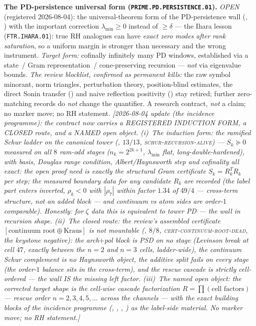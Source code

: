 \documentclass[11pt,a4paper]{article}
\begin{document}
\par\smallskip\noindent\textbf{The PD-persistence universal form
(\texttt{PRIME.PD.PERSISTENCE.01}).}
\emph{OPEN} (registered 2026-08-04): the universal-theorem form of
the PD-persistence wall (,
) with the important correction
$\lambda_{\min}\ge0$ instead of $\ge\delta$ --- the Ihara lesson
(\texttt{FTR.IHARA.01}): true RH analogues can have \emph{exact zero
modes after rank saturation}, so a uniform margin is stronger than
necessary and the wrong instrument.  \emph{Target form:} cofinally
infinitely many PD windows, established via a state~/ Gram
representation~/ cone-preserving recursion --- \emph{not} via
eigenvalue bounds.  \emph{The review blocklist, confirmed as
permanent kills:} the raw symbol minorant, norm triangles,
perturbation theory, position-blind estimates, the direct Sonin
transfer () and naive
reflection positivity ()
stay retired; further zero-matching records do \emph{not} change the
quantifier.  A research contract, \emph{not} a claim; no marker
move; no RH statement.
\emph{[2026-08-04 update (the incidence programme): the contract now
carries a REGISTERED INDUCTION FORM, a CLOSED route, and a NAMED open
object.  (i)~The induction form: the ramified Schur ladder on the
canonical tower (, $13/13$,
\textsc{schur-recursion-alive}) --- $S_k\succeq0$ measured on all
$8$ ram-odd stages ($n_k=2^{2k+1}$, $\lambda_{\min}$ flat,
long-double-hardened), with basis, Douglas range condition,
Albert/Haynsworth step and cofinality all exact: the open proof need
is \emph{exactly} the structural Gram certificate $S_k=R_k^TR_k$ per
step; the measured boundary data for any candidate $R_k$ are
recorded (the label part enters \emph{inverted}, $\rho_k<0$ with
$|\rho_7|$ within factor $1.34$ of $49/4$ --- cross-term structure,
not an added block --- and continuum vs atom sides are order-$1$
comparable).  Honestly: for $\zeta$ data this is \emph{equivalent}
to tower PD --- the wall in recursion shape.  (ii)~The closed route:
the review's assembled certificate
$[\text{continuum root}\oplus\text{Kraus}]$ is \emph{not mountable}
(, $8/8$,
\textsc{cert-continuum-root-dead}, the keystone negative): the
arch$+$pol block is PSD on \emph{no} stage (Levinson break at cell
$47$, exactly between the $n=2$ and $n=3$ cells, ladder-wide), the
continuum Schur complement is no Haynsworth object, the additive
split fails on every stage (the order-$1$ balance sits in the
cross-term), and the rescue cascade is strictly \emph{cell-ordered}
--- the wall IS the missing left factor.  (iii)~The named open
object: the corrected target shape is the \emph{cell-wise cascade
factorization} $R=\prod(\text{cell factors})$ --- rescue order
$n=2,3,4,5,\dots$ \emph{across} the channels --- with the exact
building blocks of the incidence programme
(,
, ,
) as the label-side
material.  No marker move; no RH statement.]}
\end{document}
